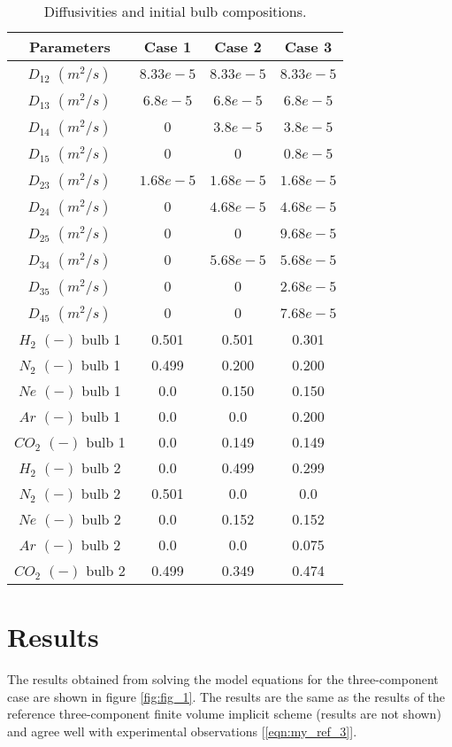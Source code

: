 \documentclass[11]{Report}
\begin{document}
    
\begin{table}[h!]
  \begin{center}
  \caption{Diffusivities and initial bulb compositions.}
    \label{tab:table1}
    \begin{tabular}{c|c|c|c} %
      \hline
      Parameters &      Case 1      &      Case 2      &      Case 3      \\
      \hline
      $D_{12}$ $(m^2 / s)$ & $8.33e-5$ & $8.33e-5$ & $8.33e-5$\\
      $D_{13}$ $(m^2 / s)$ & $6.8e-5$ & $6.8e-5$ & $6.8e-5$\\
      $D_{14}$ $(m^2 / s)$ & $0$ & $3.8e-5$ & $3.8e-5$\\
      $D_{15}$ $(m^2 / s)$ & $0$ & $0$ & $0.8e-5$ \\
      $D_{23}$ $(m^2 / s)$ & $1.68e-5$ & $1.68e-5$ & $1.68e-5$ \\
      $D_{24}$ $(m^2 / s)$ & $0$ & $4.68e-5$ & $4.68e-5$ \\
      $D_{25}$ $(m^2 / s)$ & $0$ & $0$ & $9.68e-5$ \\
      $D_{34}$ $(m^2 / s)$ & $0$ & $5.68e-5$ & $5.68e-5$ \\
      $D_{35}$ $(m^2 / s)$ & $0$ & $0$ & $2.68e-5$ \\
      $D_{45}$ $(m^2 / s)$ & $0$ & $0$ & $7.68e-5$ \\
      $H_2$ $(-)$ bulb 1 & 0.501 & 0.501 & 0.301 \\    
      $N_2$ $(-)$ bulb 1 & 0.499 & 0.200 & 0.200 \\      
      $Ne$ $(-)$ bulb 1 & 0.0 & 0.150 & 0.150 \\     
      $Ar$ $(-)$ bulb 1 & 0.0 & 0.0 & 0.200 \\
      $CO_2$ $(-)$ bulb 1 & 0.0 & 0.149 & 0.149 \\
      $H_2$ $(-)$ bulb 2 & 0.0 & 0.499 & 0.299 \\
      $N_2$ $(-)$ bulb 2 & 0.501 & 0.0 & 0.0 \\
      $Ne$ $(-)$ bulb 2 & 0.0 & 0.152 & 0.152 \\
      $Ar$ $(-)$ bulb 2 & 0.0 & 0.0 & 0.075 \\
      $CO_2$ $(-)$ bulb 2 & 0.499 & 0.349 & 0.474 \\         
      \hline
    \end{tabular}
  \end{center}
\end{table}

\section*{Results} 
The results obtained from solving the model equations for the three-component case are shown in figure \ref{fig:fig_1}. The results are the same as the results of the reference three-component finite volume implicit scheme (results are not shown) and agree well with experimental observations [\ref{eqn:my_ref_3}]. 
\end{document}
